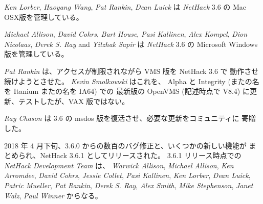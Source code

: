 \medskip
{\it Ken Lorber}, {\it Haoyang Wang}, {\it Pat Rankin}, {\it Dean Luick} は
{\it NetHack\/} 3.6 の Mac OSX版を管理している。

\medskip
{\it Michael Allison}, {\it David Cohrs}, {\it Bart House},
{\it Pasi Kallinen}, {\it Alex Kompel}, {\it Dion Nicolaas},
{\it Derek S. Ray} and  {\it Yitzhak Sapir} は {\it NetHack\/} 3.6 の
Microsoft Windows 版を管理している。

\medskip
{\it Pat Rankin} は、アクセスが制限されながら VMS 版を NetHack 3.6 で
動作させ続けようとさせた。
{\it Kevin Smolkowski} はこれを、
Alpha と Integrity (またの名を Itanium またの名を IA64) での
最新版の OpenVMS (記述時点で V8.4) に更新、テストしたが、VAX 版ではない。

\medskip
{\it Ray Chason} は 3.6 の msdos 版を復活させ、必要な更新をコミュニティに
寄贈した。

\medskip
2018 年 4 月下旬、3.6.0 からの数百のバグ修正と、いくつかの新しい機能が
まとめられ、NetHack 3.6.1 としてリリースされた。
3.6.1 リリース時点での {\it NetHack Development Team} は、
{\it Warwick Allison}, {\it Michael Allison}, {\it Ken Arromdee},
{\it David Cohrs}, {\it Jessie Collet},
{\it Pasi Kallinen}, {\it Ken Lorber}, {\it Dean Luick},
{\it Patric Mueller}, {\it Pat Rankin}, {\it Derek S. Ray},
{\it Alex Smith}, {\it Mike Stephenson}, {\it Janet Walz}, 
{\it Paul Winner} からなる。

